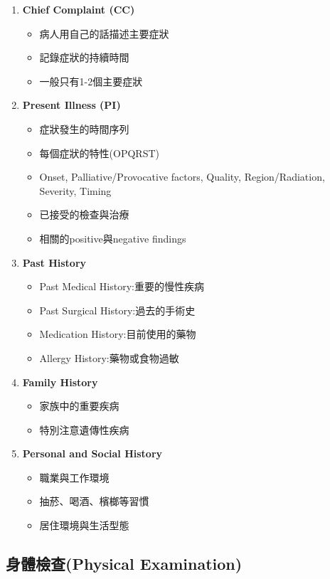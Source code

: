 \documentclass[12pt,a4paper]{article}
\begin{document}
\begin{enumerate}[leftmargin=*]
\item \textbf{Chief Complaint (CC)}
\begin{itemize}
\item 病人用自己的話描述主要症狀
\item 記錄症狀的持續時間
\item 一般只有1-2個主要症狀
\end{itemize}

\item \textbf{Present Illness (PI)}
\begin{itemize}
\item 症狀發生的時間序列
\item 每個症狀的特性(OPQRST)
\item Onset, Palliative/Provocative factors, Quality, Region/Radiation, Severity, Timing
\item 已接受的檢查與治療
\item 相關的positive與negative findings
\end{itemize}

\item \textbf{Past History}
\begin{itemize}
\item Past Medical History:重要的慢性疾病
\item Past Surgical History:過去的手術史
\item Medication History:目前使用的藥物
\item Allergy History:藥物或食物過敏
\end{itemize}

\item \textbf{Family History}
\begin{itemize}
\item 家族中的重要疾病
\item 特別注意遺傳性疾病
\end{itemize}

\item \textbf{Personal and Social History}
\begin{itemize}
\item 職業與工作環境
\item 抽菸、喝酒、檳榔等習慣
\item 居住環境與生活型態
\end{itemize}
\end{enumerate}

\subsection{身體檢查(Physical Examination)}
\end{document}
